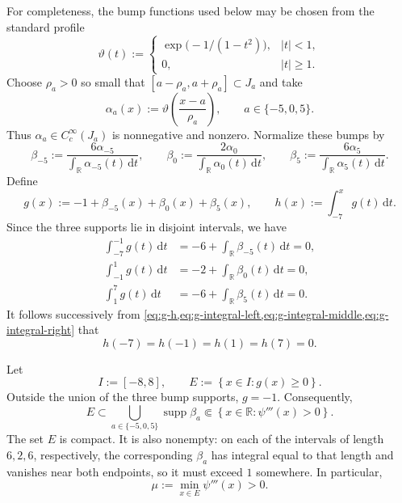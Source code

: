 \documentclass[11pt,reqno]{amsart}
\theoremstyle{definition}
\DeclareMathOperator{\supp}{supp}
\newcommand{\R}{\mathbb{R}}
\newcommand{\dd}{\,\mathrm{d}}
\newcommand{\abs}[1]{\lvert#1\rvert}
\newcommand{\set}[1]{\left\{#1\right\}}
\begin{document}
For completeness, the bump functions used below may be chosen from the
standard profile
\begin{equation}
  \vartheta(t):=
  \begin{cases}
    \exp\!\bigl(-1/(1-t^2)\bigr),&\abs{t}<1,\\
    0,&\abs{t}\ge1.
  \end{cases}
  \label{eq:standard-bump}
\end{equation}
Choose $\rho_a>0$ so small that
$[a-\rho_a,a+\rho_a]\subset J_a$ and take
\begin{equation}
  \alpha_a(x):=\vartheta\!\left(\frac{x-a}{\rho_a}\right),
  \qquad a\in\{-5,0,5\}.
\end{equation}
Thus $\alpha_a\in C_c^\infty(J_a)$ is nonnegative and nonzero.  Normalize
these bumps by
\begin{equation}
  \beta_{-5}:=
  \frac{6\alpha_{-5}}{\int_{\R}\alpha_{-5}(t)\dd t},
  \qquad
  \beta_0:=
  \frac{2\alpha_0}{\int_{\R}\alpha_0(t)\dd t},
  \qquad
  \beta_5:=
  \frac{6\alpha_5}{\int_{\R}\alpha_5(t)\dd t}.
  \label{eq:normalized-bumps}
\end{equation}
Define
\begin{equation}
  g(x):=-1+\beta_{-5}(x)+\beta_0(x)+\beta_5(x),
  \qquad
  h(x):=\int_{-7}^xg(t)\dd t.
  \label{eq:g-h}
\end{equation}
Since the three supports lie in disjoint intervals, we have
\begin{align}
  \int_{-7}^{-1}g(t)\dd t&=-6+\int_{\R}\beta_{-5}(t)\dd t=0,
  \label{eq:g-integral-left}\\
  \int_{-1}^{1}g(t)\dd t&=-2+\int_{\R}\beta_0(t)\dd t=0,
  \label{eq:g-integral-middle}\\
  \int_{1}^{7}g(t)\dd t&=-6+\int_{\R}\beta_5(t)\dd t=0.
  \label{eq:g-integral-right}
\end{align}
It follows successively from
\cref{eq:g-h,eq:g-integral-left,eq:g-integral-middle,eq:g-integral-right} that
\begin{equation}
  h(-7)=h(-1)=h(1)=h(7)=0.
  \label{eq:h-zeros}
\end{equation}

Let
\begin{equation}
  I:=[-8,8],
  \qquad
  E:=\set{x\in I:g(x)\ge0}.
  \label{eq:I-E}
\end{equation}
Outside the union of the three bump supports, $g=-1$.  Consequently,
\begin{equation}
  E\subset
  \bigcup_{a\in\{-5,0,5\}}\supp\beta_a
  \Subset\set{x\in\R:\psi'''(x)>0}.
  \label{eq:E-positive-region}
\end{equation}
The set $E$ is compact.  It is also nonempty: on each of the intervals of
length $6,2,6$, respectively, the corresponding $\beta_a$ has integral equal
to that length and vanishes near both endpoints, so it must exceed $1$
somewhere.  In particular,
\begin{equation}
  \mu:=\min_{x\in E}\psi'''(x)>0.
  \label{eq:mu}
\end{equation}
\end{document}
